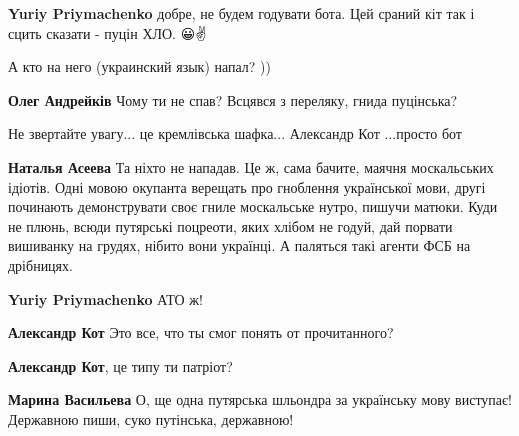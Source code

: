 \begin{itemize}
\begin{itemize}
\textbf{Yuriy Priymachenko} добре, не будем годувати бота.
Цей сраний кіт так і сцить сказати - пуцін ХЛО. 😀✌️


А кто на него (украинский язык) напал? ))


\textbf{Олег Андрейків} Чому ти не спав? Всцявся з переляку, гнида пуцінська?


Не звертайте увагу... це кремлівська шафка... Александр Кот ...просто бот


\textbf{Наталья Асеева} Та ніхто не нападав. Це ж, сама бачите, маячня москальських ідіотів. Одні мовою окупанта верещать про гноблення української мови, другі починають демонструвати своє гниле москальське нутро, пишучи матюки. Куди не плюнь, всюди путярські поцреоти, яких хлібом не годуй, дай порвати вишиванку на грудях, нібито вони українці. А паляться такі агенти ФСБ на дрібницях.


\textbf{Yuriy Priymachenko} АТО ж!


\textbf{Александр Кот}
Это все, что ты смог понять от прочитанного?


\textbf{Александр Кот}, це типу ти патріот?🤣🤣🤣


\textbf{Марина Васильева} О, ще одна путярська шльондра за українську мову виступає! Державною пиши, суко путінська, державною!


\end{itemize}
\end{itemize}
